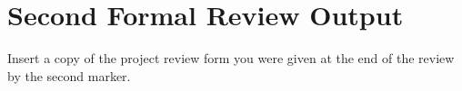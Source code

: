 \chapter{Second Formal Review Output}
\label{AppendixB}
Insert a copy of the project review form you were given at the end of the review by the second marker.